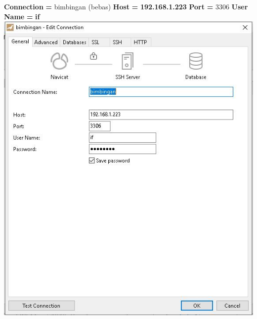 \documentclass{article}
\begin{document}
        \begin{enumerate}
            \textbf{Connection} \textbf{=} bimbingan (bebas) \newline \textbf{Host} \textbf{=} \textbf{192.168.1.223} \newline \textbf{Port} \textbf{=} 3306 \newline \textbf{User Name} \textbf{=} \textbf{if}
            \newline
            \includegraphics[scale=0.4]{28.2.jpg}
            \newline
            \seti %
        \end{enumerate}
    
\end{document}
